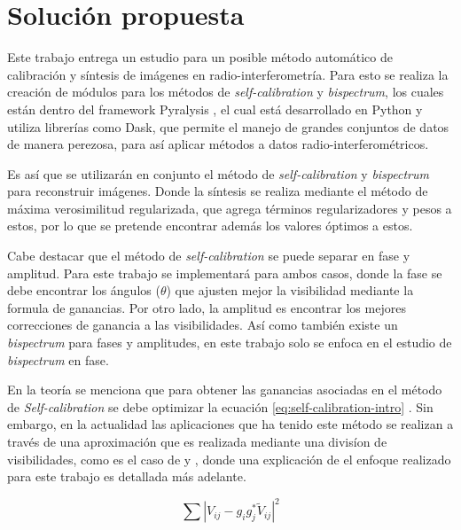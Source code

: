 \section{Soluci\'on propuesta}
\label{intro:solucion}

Este trabajo entrega un estudio para un posible método automático de calibración y síntesis de imágenes en radio-interferometría. Para esto se realiza la creación de módulos para los métodos de \textit{self-calibration} y \textit{bispectrum}, los cuales están dentro del framework Pyralysis \citep{winNT}, el cual está desarrollado en Python y utiliza librerías como Dask, que permite el manejo de grandes conjuntos de datos de manera perezosa, para así aplicar métodos a datos radio-interferométricos. 

Es así que se utilizarán en conjunto el método de \textit{self-calibration} y \textit{bispectrum} para reconstruir imágenes. Donde la síntesis se realiza mediante el método de máxima verosimilitud regularizada, que agrega términos regularizadores y pesos a estos, por lo que se pretende encontrar además los valores óptimos a estos. 

Cabe destacar que el método de \textit{self-calibration} se puede separar en fase y amplitud. Para este trabajo se implementará para ambos casos, donde la fase se debe encontrar los ángulos ($\theta$) que ajusten mejor la visibilidad mediante la formula de ganancias. Por otro lado, la amplitud es encontrar los mejores correcciones de ganancia a las visibilidades. Así como también existe un \textit{bispectrum} para fases y amplitudes, en este trabajo solo se enfoca en el estudio de \textit{bispectrum} en fase. 

En la teoría \citep{selfCalibration} se menciona que para obtener las ganancias asociadas en el método de \textit{Self-calibration} se debe optimizar la ecuación \ref{eq:self-calibration-intro} \citep{selfCalibration}. Sin embargo, en la actualidad las aplicaciones que ha tenido este método se realizan a través de una aproximación que es realizada mediante una divisíon de visibilidades, como es el caso de \citep{gaincal_task} y \citep{rascil}, donde una explicación de el enfoque realizado para este trabajo es detallada más adelante. 
 


\begin{equation}
    \sum |V_{ij} - g_{i}g_{j}^{*}\tilde{V}_{ij}|^2
    \label{eq:self-calibration-intro}
\end{equation}

